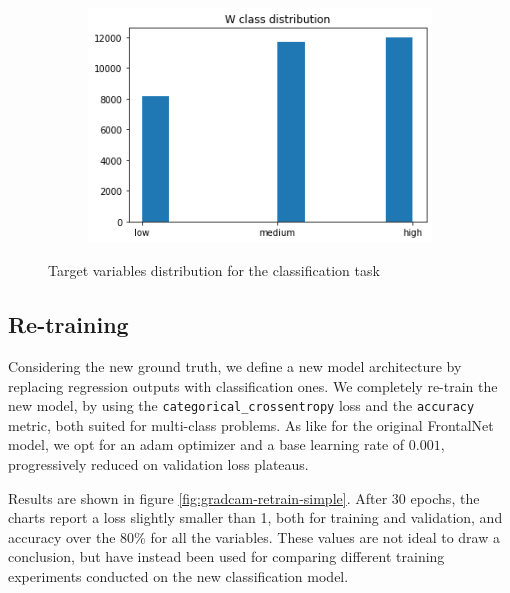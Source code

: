 \begin{figure}[!h]
\begin{center}
\begin{subfigure}[h]{0.24\textwidth}
		\end{subfigure}
		\hfill
		\begin{subfigure}[h]{0.24\textwidth}
			\centering
			\includegraphics[width=1\textwidth]{"contents/images/distributions/w-class"}
		\end{subfigure}
	\end{center}
	\vspace{-0.5cm}
	\caption[Target variables distribution for the classification task]{Target variables distribution for the classification task}
	\label{fig:frontalnet-dataset-distribution-class}
\end{figure}



\subsection{Re-training}
\label{subsec:gradcam-retrain}

Considering the new ground truth, we define a new model architecture by replacing regression outputs with classification ones. We completely re-train the new model, by using the \texttt{categorical\_crossentropy} loss and the \texttt{accuracy} metric, both suited for multi-class problems. As like for the original FrontalNet model, we opt for an \gls{adam} optimizer and a base learning rate of $0.001$, progressively reduced on validation loss plateaus. 

Results are shown in figure \ref{fig:gradcam-retrain-simple}. After 30 epochs, the charts report a loss slightly smaller than 1, both for training and validation, and accuracy over the 80\% for all the variables. These values are not ideal to draw a conclusion, but have instead been used for comparing different training experiments conducted on the new classification model.

